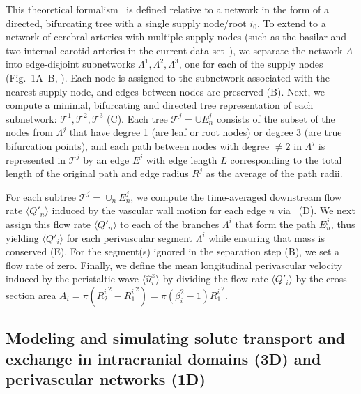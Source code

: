 \documentclass[fleqn,10pt]{wlscirep}
\begin{document}
This theoretical formalism~\cite{gjerde2023directional} is defined
relative to a network in the form of a directed, bifurcating tree with
a single supply node/root $i_0$. To extend to a network of cerebral
arteries with multiple supply nodes (such as the basilar and two
internal carotid arteries in the current data
set~\cite{hodneland2019new}), we separate the network $\Lambda$ into
edge-disjoint subnetworks $\Lambda^1, \Lambda^2, \Lambda^3$, one for
each of the supply nodes (Fig.~1A--B,
). Each node is assigned to the subnetwork
associated with the nearest supply node, and edges between nodes are
preserved (B). Next, we compute a minimal,
bifurcating and directed tree representation of each subnetwork:
$\mathcal{T}^1, \mathcal{T}^2, \mathcal{T}^3$
(C). Each tree $\mathcal{T}^j = \cup E_n^j$
consists of the subset of the nodes from $\Lambda^j$ that have degree
1 (are leaf or root nodes) or degree $3$ (are true bifurcation
points), and each path between nodes with degree $\not = 2$ in
$\Lambda^j$ is represented in $\mathcal{T}^j$ by an edge $E^j$ with
edge length $L$ corresponding to the total length of the original path
and edge radius $R^j$ as the average of the path radii.

For each subtree $\mathcal{T}^j = \cup_n E_n^j$, we compute the
time-averaged downstream flow rate $\langle Q'_n \rangle$ induced by
the vascular wall motion for each edge $n$ via~\cite[eq.~(5),
  (34)]{gjerde2023directional} (D). We next
assign this flow rate $\langle Q'_n \rangle$ to each of the branches
$\Lambda^i$ that form the path $E_n^j$, thus yielding $\langle Q'_i
\rangle$ for each perivascular segment $\Lambda^i$ while ensuring that
mass is conserved (E). For the segment(s)
ignored in the separation step (B), we set a
flow rate of zero. Finally, we define the mean longitudinal
perivascular velocity induced by the peristaltic wave $\langle
\hat{u}^x_i \rangle$ by dividing the flow rate $\langle Q'_i \rangle$
by the cross-section area $A_i = \pi ({R_2^i}^2 - {R_1^i}^2) = \pi
(\beta_i^2 - 1) {R_1^i}^2$.

\subsection{Modeling and simulating solute transport and exchange in intracranial domains (3D) and perivascular networks (1D)}
\label{sec:app:transport_eqs}
\end{document}
